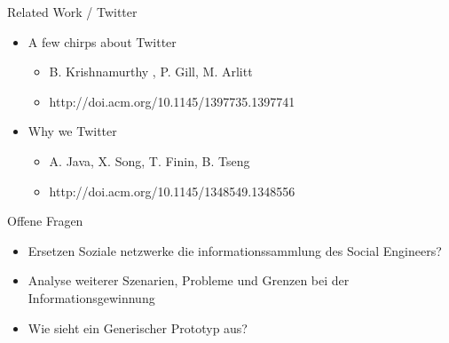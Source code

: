 \documentclass[11pt]{beamer}
\begin{document}
\begin{frame}{Related Work / Twitter}
  \begin{itemize}
    \item A few chirps about Twitter
    \begin{itemize}
      \item B. Krishnamurthy , P. Gill, M. Arlitt
      \item http://doi.acm.org/10.1145/1397735.1397741
    \end{itemize}
    \item Why we Twitter
    \begin{itemize}
      \item A. Java, X. Song, T. Finin, B. Tseng
      \item http://doi.acm.org/10.1145/1348549.1348556
    \end{itemize}
  \end{itemize}
\end{frame}

\begin{frame}{Offene Fragen}
  \begin{itemize}
    \item Ersetzen Soziale netzwerke die informationssammlung des Social Engineers?
    \item Analyse weiterer Szenarien, Probleme und Grenzen bei der Informationsgewinnung
    \item Wie sieht ein Generischer Prototyp aus?
  \end{itemize}
\end{frame}
\end{document}

